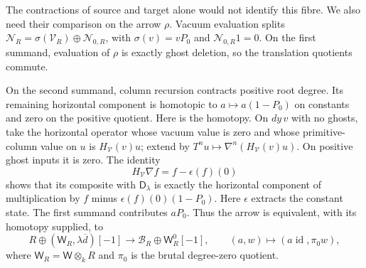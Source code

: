 The contractions of source and target alone would not identify
this fibre. We also need their comparison on the arrow $\rho$.
Vacuum evaluation splits
$\mathcal N_R=\sigma(\mathcal V_R)\oplus\mathcal N_{0,R}$,
with $\sigma(v)=vP_0$ and $\mathcal N_{0,R}1=0$.
On the first summand, evaluation of $\rho$ is exactly ghost
deletion, so the translation quotients commute.

On the second summand, column recursion contracts positive root
degree. Its remaining horizontal component is homotopic to
$a\mapsto a(1-P_0)$ on constants and zero on the positive
quotient. Here is the homotopy. On $dy\,v$ with no ghosts, take
the horizontal operator whose vacuum value is zero and whose
primitive-column value on $u$ is $H_{\mathcal V}(v)u$; extend by
$T^nu\mapsto\nabla^n(H_{\mathcal V}(v)u)$. On positive ghost
inputs it is zero. The identity
\[
 H_{\mathcal V}\nabla f=f-\epsilon(f)(0)
\]
shows that its composite with $\mathsf D_\lambda$ is exactly
the horizontal component of multiplication by $f$ minus
$\epsilon(f)(0)(1-P_0)$. Here $\epsilon$ extracts the constant
state. The first summand contributes $aP_0$. Thus the arrow is
equivalent, with its homotopy supplied, to
\begin{equation}\label{eq:vol2-integral-reduced-arrow}
 R\oplus(\mathsf W_R,\lambda\overline d)[-1]
   \longrightarrow\mathcal B_R\oplus\mathsf W_R^0[-1],
 \qquad (a,w)\longmapsto(a\operatorname{id},\pi_0w),
\end{equation}
where $\mathsf W_R=\mathsf W\otimes_kR$ and $\pi_0$ is the
brutal degree-zero quotient.


